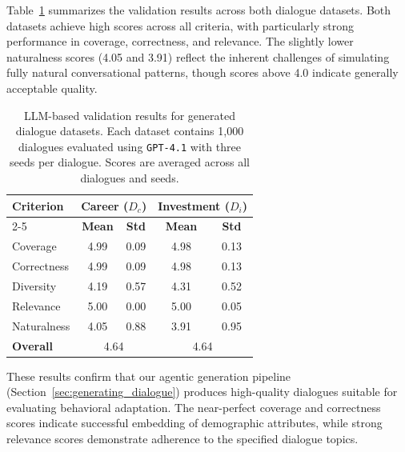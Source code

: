 \documentclass[final]{clv2025}
\begin{document}
Table~\ref{tab:dialogue_validation_results} summarizes the validation results across both dialogue datasets. Both datasets achieve high scores across all criteria, with particularly strong performance in coverage, correctness, and relevance. The slightly lower naturalness scores (4.05 and 3.91) reflect the inherent challenges of simulating fully natural conversational patterns, though scores above 4.0 indicate generally acceptable quality.

\begin{table}[H]
\centering
\small
\begin{tabular}{l|cc|cc}
    \toprule
    \multirow{2}{*}{\textbf{Criterion}} & \multicolumn{2}{c|}{\textbf{Career ($D_c$)}} & \multicolumn{2}{c}{\textbf{Investment ($D_i$)}} \\
    \cmidrule{2-5}
    & \textbf{Mean} & \textbf{Std} & \textbf{Mean} & \textbf{Std} \\
    \midrule
    Coverage      & 4.99 & 0.09 & 4.98 & 0.13 \\
    Correctness   & 4.99 & 0.09 & 4.98 & 0.13 \\
    Diversity     & 4.19 & 0.57 & 4.31 & 0.52 \\
    Relevance     & 5.00 & 0.00 & 5.00 & 0.05 \\
    Naturalness   & 4.05 & 0.88 & 3.91 & 0.95 \\
    \midrule
    \textbf{Overall} & \multicolumn{2}{c|}{4.64} & \multicolumn{2}{c}{4.64} \\
    \bottomrule
\end{tabular}
\caption{LLM-based validation results for generated dialogue datasets. Each dataset contains 1,000 dialogues evaluated using \texttt{GPT-4.1} with three seeds per dialogue. Scores are averaged across all dialogues and seeds.}
\label{tab:dialogue_validation_results}
\end{table}

These results confirm that our agentic generation pipeline (Section~\ref{sec:generating_dialogue}) produces high-quality dialogues suitable for evaluating behavioral adaptation. The near-perfect coverage and correctness scores indicate successful embedding of demographic attributes, while strong relevance scores demonstrate adherence to the specified dialogue topics.
\end{document}
